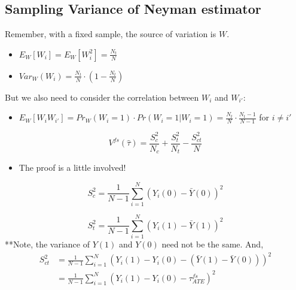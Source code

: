 \documentclass[
  letterpaper,
  DIV=11,
  numbers=noendperiod]{scrreprt}
\providecommand{\tightlist}{%
  \setlength{\itemsep}{0pt}\setlength{\parskip}{0pt}}\usepackage{longtable,booktabs,array}
\theoremstyle{definition}
\theoremstyle{remark}
\begin{document}
\subsection{Sampling Variance of Neyman
estimator}\label{sampling-variance-of-neyman-estimator}

Remember, with a fixed sample, the source of variation is \(W\).

\begin{itemize}
\tightlist
\item
  \(E_W[W_i]=E_W[W_i^2] = \frac{N_t}{N}\)
\item
  \(Var_W(W_i) = \frac{N_t}{N}\cdot(1-\frac{N_t}{N})\)
\end{itemize}

But we also need to consider the correlation between \(W_i\) and
\(W_{i'}\):

\begin{itemize}
\tightlist
\item
  \(E_W[W_iW_{i'}]=Pr_W(W_i=1)\cdot Pr(W_i=1|W_i=1) = \frac{N_t}{N}\cdot\frac{N_t-1}{N-1}\)
  for \(i\neq i'\)
\end{itemize}

\begin{tcolorbox}[enhanced jigsaw, bottomrule=.15mm, coltitle=black, arc=.35mm, left=2mm, opacityback=0, leftrule=.75mm, colbacktitle=quarto-callout-tip-color!10!white, title={Finite sampling variance of \(\hat{\tau}\)}, toprule=.15mm, bottomtitle=1mm, breakable, colframe=quarto-callout-tip-color-frame, opacitybacktitle=0.6, titlerule=0mm, colback=white, rightrule=.15mm, toptitle=1mm]

\[
                V^{fs}(\hat{\tau}) = \frac{S^2_c}{N_c}+\frac{S^2_t}{N_t}-\frac{S^2_{ct}}{N}
\]

\end{tcolorbox}

\begin{itemize}
\tightlist
\item
  The proof is a little involved!
\end{itemize}

\[
        S^2_c = \frac{1}{N-1}\sum_{i=1}^N (Y_i(0)-\bar{Y}(0))^2
\]

\[
    S^2_t = \frac{1}{N-1}\sum_{i=1}^N (Y_i(1)-\bar{Y}(1))^2
\] **Note, the variance of \(Y(1)\) and \(Y(0)\) need not be the same.
And, \[
        \begin{align*}
        S^2_{ct} &= \frac{1}{N-1}\sum_{i=1}^N (Y_i(1)-Y_i(0)-(\bar{Y}(1)-\bar{Y}(0)))^2 \\
        &=\frac{1}{N-1}\sum_{i=1}^N (Y_i(1)-Y_i(0)-\tau^{fs}_{ATE})^2
        \end{align*}
\]
\end{document}
